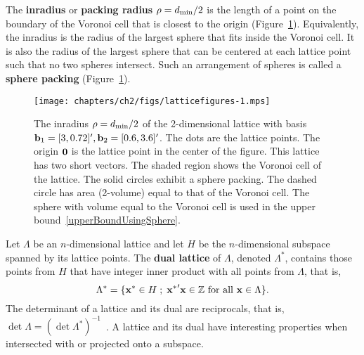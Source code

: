 The \textbf{inradius} or \textbf{packing radius} $\rho = d_{\text{min}}/2$ is the length of a point on the boundary of the Voronoi cell that is closest to the origin (Figure~\ref{fig:bound_dmin}).  Equivalently, the inradius is the radius of the largest sphere that fits inside the Voronoi cell.  It is also the radius of the largest sphere that can be centered at each lattice point such that no two spheres intersect.  Such an arrangement of spheres is called a \textbf{sphere packing} (Figure~\ref{fig:bound_dmin}).

\begin{figure}[t]
\begin{center}   
\texttt{[image: chapters/ch2/figs/latticefigures-1.mps]}
\caption{The inradius $\rho = d_{\text{min}}/2$ of the 2-dimensional lattice with basis $\mathbf{b}_1 = [3,0.72]^\prime, \mathbf{b}_2 = [0.6,3.6]^\prime$. The dots are the lattice points.  The origin $\boldsymbol{0}$ is the lattice point in the center of the figure.  This lattice has two short vectors.  The shaded region shows the Voronoi cell of the lattice.  The solid circles exhibit a sphere packing.  The dashed circle has area (2-volume) equal to that of the Voronoi cell. The sphere with volume equal to the Voronoi cell is used in the upper bound~\ref{upperBoundUsingSphere}.}
\label{fig:bound_dmin}
\end{center}  
\end{figure} 


Let $\Lambda$ be an $n$-dimensional lattice and let $H$ be the $n$-dimensional subspace spanned by its lattice points. The \textbf{dual lattice} of $\Lambda$, denoted $\Lambda^*$, contains those points from $H$ that have integer inner product with all points from $\Lambda$, that is,
\[
\Lambda^* = \{ \mathbf{x}^* \in H \; ; \; {\mathbf{x}^*}^\prime \mathbf{x} \in {\mathbb Z} \text{ for all } \mathbf{x} \in \Lambda \}.
\]
The determinant of a lattice and its dual are reciprocals, that is, $\det\Lambda = (\det\Lambda^*)^{-1}$~\cite[p. 10]{SPLAG}.  A lattice and its dual have interesting properties when intersected with or projected onto a subspace.  %


